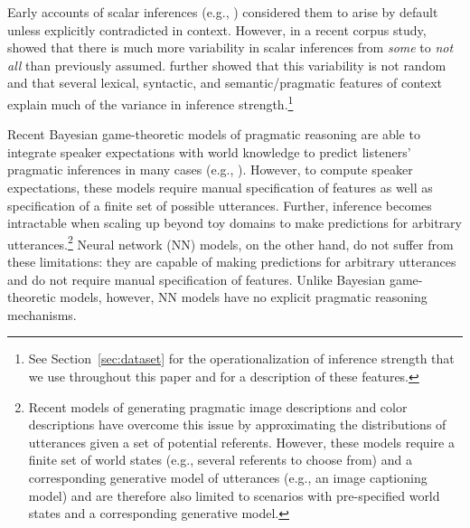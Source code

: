 \documentclass[11pt,a4paper]{article}
\begin{document}
Early accounts of scalar inferences (e.g., \citealt{gazdar1979pragmatics,Horn1984,levinson2000presumptive}) considered them to arise by default unless explicitly contradicted in context. However, in a recent corpus study,  showed that there is much more variability in scalar inferences from \textit{some} to \emph{not all} than previously assumed.  further showed that this variability is not random and that several lexical, syntactic, and semantic/pragmatic features of context explain much of the variance in inference strength.\footnote{See Section~\ref{sec:dataset} for the operationalization of inference strength that we use throughout this paper and for a description of these features.}

Recent Bayesian game-theoretic models of pragmatic reasoning \citep{goodman2016pragmatic,franke2016probabilistic} are able to integrate speaker expectations with world knowledge to predict listeners' pragmatic inferences in many cases (e.g., \citealt{goodman2013knowledge,degen2015wonky}). However, to compute speaker expectations, these models require manual specification of features as well as specification of a finite set of possible utterances. Further, inference becomes intractable when scaling up beyond toy domains to make predictions for arbitrary utterances.\footnote{Recent models of generating pragmatic image descriptions \citep{Andreas2016,CohnGordon2018} and color descriptions \citep{Monroe2017} have overcome this issue by approximating the distributions of utterances given a set of potential referents. However, these models require a finite set of world states (e.g., several referents to choose from) and a corresponding generative model of utterances (e.g., an image captioning model) and are therefore also limited to scenarios with pre-specified world states and a corresponding generative model.} Neural network (NN) models, on the other hand, do not suffer from these limitations: they are capable of making predictions for arbitrary utterances and do not require manual specification of features. Unlike Bayesian game-theoretic models, however, NN models have no explicit pragmatic reasoning mechanisms.
\end{document}
